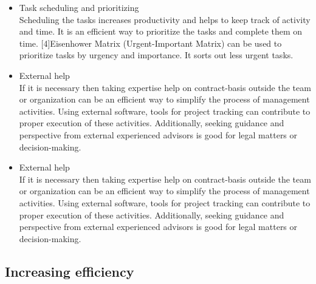 \documentclass[a4paper,12pt]{article}
\begin{document}
\begin{itemize}
\item Task scheduling and prioritizing
\\ Scheduling the tasks increases productivity and helps to keep track of activity and time. It is an efficient way to prioritize the tasks and complete them on time. [4]Eisenhower Matrix (Urgent-Important Matrix) can be used to prioritize tasks by urgency and importance. It sorts out less urgent tasks.

\item External help
\\ If it is necessary then taking expertise help on contract-basis outside the team or organization can be an efficient way to simplify the process of management activities. Using external software, tools for project tracking can contribute to proper execution of these activities. Additionally, seeking guidance and perspective from external experienced advisors is good for legal matters or decision-making.


\item External help
\\ If it is necessary then taking expertise help on contract-basis outside the team or organization can be an efficient way to simplify the process of management activities. Using external software, tools for project tracking can contribute to proper execution of these activities. Additionally, seeking guidance and perspective from external experienced advisors is good for legal matters or decision-making.
\end{itemize}


\subsection{Increasing efficiency}
\end{document}
